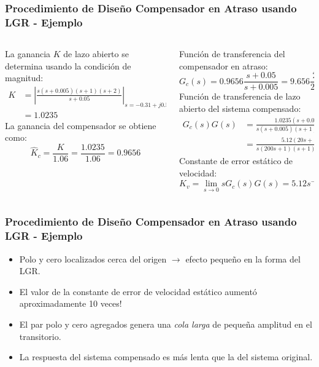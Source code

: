 \documentclass[aspectratio=169,handout]{beamer}
\theoremstyle{definition}
\theoremstyle{plain}
\theoremstyle{remark}
\begin{document}
\begin{frame}[c]\frametitle{Procedimiento de Diseño Compensador en Atraso usando LGR - Ejemplo}
	\small
	\vspace*{3mm}
	\begin{columns}
		\begin{column}{0.5\textwidth}
			La ganancia $K$ de lazo abierto se determina usando la condición de magnitud:
			\begin{align*}
				K &= \left| \frac{s(s+0.005)(s+1)(s+2)}{s+0.05} \right|_{s=-0.31+j0.55}\\
				&= 1.0235
			\end{align*}
			\pause
			La ganancia del compensador se obtiene como:
			\begin{equation*}
				\hat{K}_c = \frac{K}{1.06} = \frac{1.0235}{1.06} = 0.9656
			\end{equation*}
			\pause
		\end{column}
		\begin{column}{0.5\textwidth}
			Función de transferencia del compensador en atraso:
			\begin{equation*}
				G_c(s) = 0.9656\frac{s+0.05}{s+0.005} = 9.656\frac{20s+1}{200s+1}
			\end{equation*}
			\pause
			Función de transferencia de lazo abierto del sistema compensado:
			\begin{align*}
				G_c(s)G(s) &= \frac{1.0235(s+0.05)}{s(s+0.005)(s+1)(s+2)}\\
				&= \frac{5.12(20s+1)}{s(200s+1)(s+1)(0.5s+1)}
			\end{align*}
			\pause
			Constante de error estático de velocidad:
			\begin{equation*}
				K_v = \lim_{s \rightarrow 0}sG_c(s)G(s) = 5.12 s^{-1}
			\end{equation*}
		\end{column}
	\end{columns}
\end{frame}

\begin{frame}[<+->]\frametitle{Procedimiento de Diseño Compensador en Atraso usando LGR - Ejemplo}
	\begin{itemize}
		\item Polo y cero localizados cerca del origen $\rightarrow$ efecto pequeño en la forma del LGR.
		\item El valor de la constante de error de velocidad estático aumentó aproximadamente 10 veces!
		\item El par polo y cero agregados genera una \textit{cola larga} de pequeña amplitud en el transitorio.
		\item La respuesta del sistema compensado es más lenta que la del sistema original.
	\end{itemize}
\end{frame}
\end{document}
